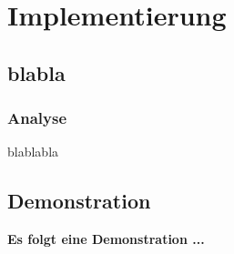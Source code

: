 \section{Implementierung}
\subsection{blabla}
\begin{frame} %
  \frametitle{Analyse} %

blablabla
\end{frame}


\subsection{Demonstration}
\begin{frame} %

  \textbf{Es folgt eine Demonstration ...}
\end{frame}